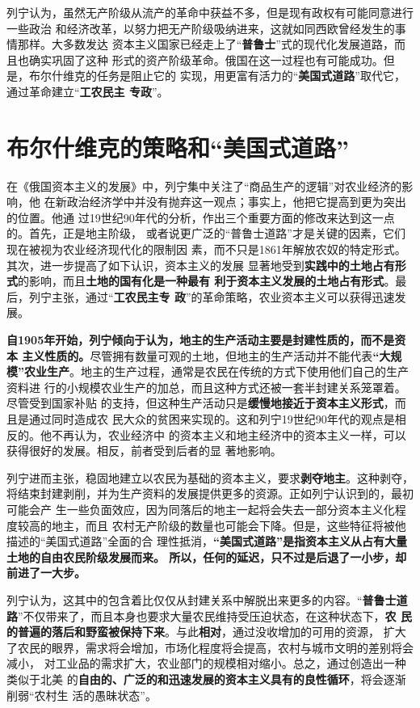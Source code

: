 列宁认为，虽然无产阶级从流产的革命中获益不多，但是现有政权有可能同意进行一些政治
和经济改革，以努力把无产阶级吸纳进来，这就如同西欧曾经发生的事情那样。大多数发达
资本主义国家已经走上了“\textbf{普鲁士}”式的现代化发展道路，而且也确实巩固了这种
形式的资产阶级革命。俄国在这一过程也有可能成功。但是，布尔什维克的任务是阻止它的
实现，用更富有活力的“\textbf{美国式道路}”取代它，通过革命建立“\textbf{工农民主
  专政}”。

\section{布尔什维克的策略和“美国式道路”}

在《俄国资本主义的发展》中，列宁集中关注了“商品生产的逻辑”对农业经济的影响，他
在新政治经济学中并没有抛弃这一观点；事实上，他把它提高到更为突出的位置。他通
过19世纪90年代的分析，作出三个重要方面的修改来达到这一点的。首先，正是地主阶级，
或者说更广泛的“普鲁士道路”才是关键的因素，它们现在被视为农业经济现代化的限制因
素，而不只是1861年解放农奴的特定形式。其次，进一步提高了如下认识，资本主义的发展
显著地受到\textbf{实践中的土地占有形式}的影响，而且\textbf{土地的国有化是一种最有
  利于资本主义发展的土地占有形式}。最后，列宁主张，通过“\textbf{工农民主专
  政}”的革命策略，农业资本主义可以获得迅速发展。

\textbf{自1905年开始，列宁倾向于认为，地主的生产活动主要是封建性质的，而不是资本
  主义性质的。}尽管拥有数量可观的土地，但地主的生产活动并不能代表\textbf{“大规
  模”农业生产}。地主的生产过程，通常是农民在传统的方式下使用他们自己的生产资料进
行的小规模农业生产的加总，而且这种方式还被一套半封建关系笼罩着。尽管受到国家补贴
的支持，但这种生产活动只是\textbf{缓慢地接近于资本主义形式}，而且是通过同时造成农
民大众的贫困来实现的。这和列宁19世纪90年代的观点是相反的。他不再认为，农业经济中
的资本主义和地主经济中的资本主义一样，可以获得很好的发展。相反，前者受到后者的显
著地影响。

列宁进而主张，稳固地建立以农民为基础的资本主义，要求\textbf{剥夺地主}。这种剥夺，
将结束封建剥削，并为生产资料的发展提供更多的资源。正如列宁认识到的，最初可能会产
生一些负面效应，因为同落后的地主一起将会失去一部分资本主义化程度较高的地主，而且
农村无产阶级的数量也可能会下降。但是，这些特征将被他描述的“美国式道路”全面的合
理性抵消，\textbf{“美国式道路”是指资本主义从占有大量土地的自由农民阶级发展而来。
  所以，任何的延迟，只不过是后退了一小步，却前进了一大步。}

列宁认为，这其中的包含着比仅仅从封建关系中解脱出来更多的内容。“\textbf{普鲁士道
  路}”不仅带来了，而且本身也要求大量农民维持受压迫状态，在这种状态下，\textbf{农
  民的普遍的落后和野蛮被保持下来}。与此\textbf{相对}，通过没收增加的可用的资源，
扩大了农民的眼界，需求将会增加，市场化程度将会提高，农村与城市文明的差别将会减小，
对工业品的需求扩大，农业部门的规模相对缩小。总之，通过创造出一种类似于北美
的\textbf{自由的、广泛的和迅速发展的资本主义具有的良性循环}，将会逐渐削弱“农村生
活的愚昧状态”。

